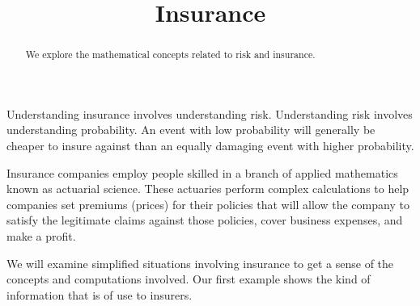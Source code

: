 \documentclass{ximera}
\title{Insurance}
\begin{document}
\begin{abstract}
We explore the mathematical concepts related to risk and insurance.
\end{abstract}

\maketitle

Understanding insurance involves understanding risk. Understanding risk involves understanding probability. An event with low probability will generally be cheaper to insure against than an equally damaging event with higher probability.

Insurance companies employ people skilled in a branch of applied mathematics known as actuarial science. These actuaries perform complex calculations to help companies set premiums (prices) for their policies that will allow the company to satisfy the legitimate claims against those policies, cover business expenses, and make a profit.

We will examine simplified situations involving insurance to get a sense of the concepts and computations involved. Our first example shows the kind of information that is of use to insurers.
\end{document}
